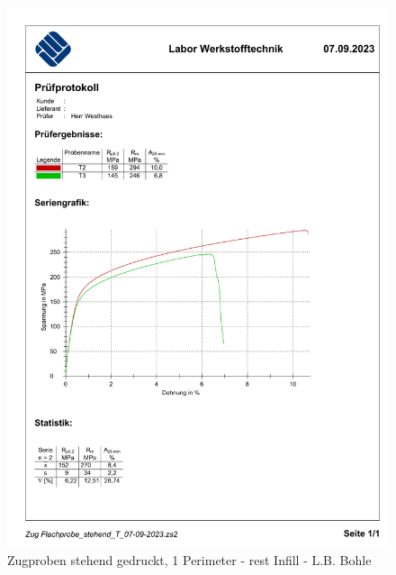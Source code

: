   \begin{figure}[ht]
    \centering
    \includegraphics[width=1\textwidth]{bilder/Zug Flachprobe_stehend_T.pdf}
    \caption{Zugproben stehend gedruckt, 1 Perimeter - rest Infill - L.B. Bohle}
    \label{ZugprobenT}
  \end{figure}
  \FloatBarrier
 
